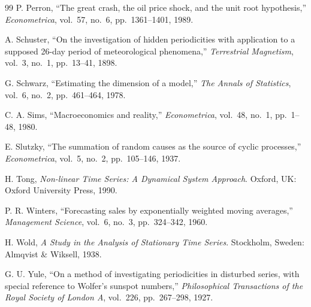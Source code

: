 \documentclass[conference]{IEEEtran}
\theoremstyle{definition}
\begin{document}
\begin{thebibliography}{99}
P. Perron, ``The great crash, the oil price shock, and the unit root
hypothesis,'' \textit{Econometrica}, vol.~57, no.~6, pp.~1361--1401, 1989.

A. Schuster, ``On the investigation of hidden periodicities with application
to a supposed 26-day period of meteorological phenomena,''
\textit{Terrestrial Magnetism}, vol.~3, no.~1, pp.~13--41, 1898.

G. Schwarz, ``Estimating the dimension of a model,''
\textit{The Annals of Statistics}, vol.~6, no.~2, pp.~461--464, 1978.

C. A. Sims, ``Macroeconomics and reality,''
\textit{Econometrica}, vol.~48, no.~1, pp.~1--48, 1980.

E. Slutzky, ``The summation of random causes as the source of cyclic
processes,'' \textit{Econometrica}, vol.~5, no.~2, pp.~105--146, 1937.

H. Tong,
\textit{Non-linear Time Series: A Dynamical System Approach}.
Oxford, UK: Oxford University Press, 1990.

P. R. Winters, ``Forecasting sales by exponentially weighted moving averages,''
\textit{Management Science}, vol.~6, no.~3, pp.~324--342, 1960.

H. Wold,
\textit{A Study in the Analysis of Stationary Time Series}.
Stockholm, Sweden: Almqvist \& Wiksell, 1938.

G. U. Yule, ``On a method of investigating periodicities in disturbed
series, with special reference to Wolfer's sunspot numbers,''
\textit{Philosophical Transactions of the Royal Society of London A},
vol.~226, pp.~267--298, 1927.

\end{thebibliography}
\end{document}
